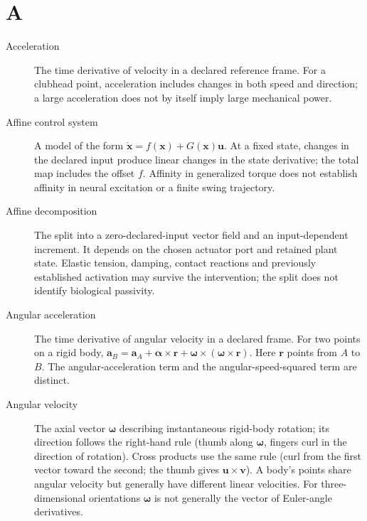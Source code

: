 \section*{A}
\begin{description}

\item[Acceleration] The time derivative of velocity in a declared reference frame. For a clubhead point, acceleration includes changes in both speed and direction; a large acceleration does not by itself imply large mechanical power.

\item[Affine control system] A model of the form $\dot{\mathbf{x}}=f(\mathbf{x})+G(\mathbf{x})\mathbf{u}$. At a fixed state, changes in the declared input produce linear changes in the state derivative; the total map includes the offset $f$. Affinity in generalized torque does not establish affinity in neural excitation or a finite swing trajectory.

\item[Affine decomposition] The split into a zero-declared-input vector field and an input-dependent increment. It depends on the chosen actuator port and retained plant state. Elastic tension, damping, contact reactions and previously established activation may survive the intervention; the split does not identify biological passivity.

\item[Angular acceleration] The time derivative of angular velocity in a declared frame. For two points on a rigid body, $\mathbf{a}_B=\mathbf{a}_A+\boldsymbol{\alpha}\times\mathbf{r}+\boldsymbol{\omega}\times(\boldsymbol{\omega}\times\mathbf{r})$. Here $\mathbf{r}$ points from $A$ to $B$. The angular-acceleration term and the angular-speed-squared term are distinct.

\item[Angular velocity] The axial vector $\boldsymbol{\omega}$ describing instantaneous rigid-body rotation; its direction follows the right-hand rule (thumb along $\boldsymbol{\omega}$, fingers curl in the direction of rotation). Cross products use the same rule (curl from the first vector toward the second; the thumb gives $\mathbf{u}\times\mathbf{v}$). A body's points share angular velocity but generally have different linear velocities. For three-dimensional orientations $\boldsymbol{\omega}$ is not generally the vector of Euler-angle derivatives.

\end{description}
